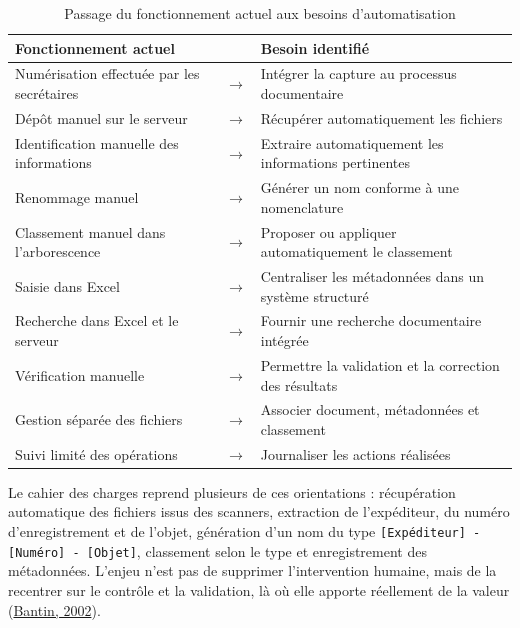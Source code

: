 \documentclass[12pt,a4paper]{report}
\newcommand{\tableheader}[1]{\textbf{\small #1}}
\newcommand{\tabarrow}{\ensuremath{\rightarrow}}
\newcommand{\citer}[2]{\hyperref[ref:#1]{#2}}
\begin{document}
\begin{table}[htbp]
\centering
\caption{Passage du fonctionnement actuel aux besoins d'automatisation}
\label{tab:existant-vers-besoins}
\small
\renewcommand{\arraystretch}{1.55}
\begingroup
{}
\begin{tabularx}{\textwidth}{@{}Y>{\centering\arraybackslash}p{0.85cm}Y@{}}
\toprule
{}
\tableheader{Fonctionnement actuel} &
\tableheader{} &
\tableheader{Besoin identifié} \\
\midrule
Numérisation effectuée par les secrétaires & \tabarrow & Intégrer la capture au processus documentaire \\
Dépôt manuel sur le serveur & \tabarrow & Récupérer automatiquement les fichiers \\
Identification manuelle des informations & \tabarrow & Extraire automatiquement les informations pertinentes \\
Renommage manuel & \tabarrow & Générer un nom conforme à une nomenclature \\
Classement manuel dans l'arborescence & \tabarrow & Proposer ou appliquer automatiquement le classement \\
Saisie dans Excel & \tabarrow & Centraliser les métadonnées dans un système structuré \\
Recherche dans Excel et le serveur & \tabarrow & Fournir une recherche documentaire intégrée \\
Vérification manuelle & \tabarrow & Permettre la validation et la correction des résultats \\
Gestion séparée des fichiers & \tabarrow & Associer document, métadonnées et classement \\
Suivi limité des opérations & \tabarrow & Journaliser les actions réalisées \\
\bottomrule
\end{tabularx}
\endgroup
\end{table}

Le cahier des charges reprend plusieurs de ces orientations : récupération automatique des fichiers issus des scanners, extraction de l'expéditeur, du numéro d'enregistrement et de l'objet, génération d'un nom du type \texttt{[Expéditeur] - [Numéro] - [Objet]}, classement selon le type et enregistrement des métadonnées. L'enjeu n'est pas de supprimer l'intervention humaine, mais de la recentrer sur le contrôle et la validation, là où elle apporte réellement de la valeur (\citer{bantin2002}{Bantin, 2002}).
\end{document}
